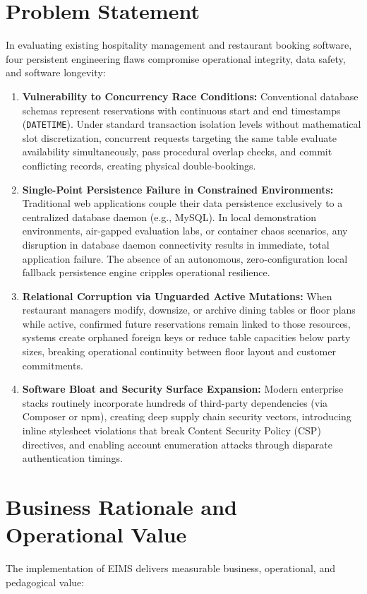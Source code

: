 \section{Problem Statement}
\label{sec:intro_problem}
In evaluating existing hospitality management and restaurant booking software, four persistent engineering flaws compromise operational integrity, data safety, and software longevity:

\begin{enumerate}[label=\textbf{P\arabic*.}]
    \item \textbf{Vulnerability to Concurrency Race Conditions:} Conventional database schemas represent reservations with continuous start and end timestamps (\texttt{DATETIME}). Under standard transaction isolation levels without mathematical slot discretization, concurrent requests targeting the same table evaluate availability simultaneously, pass procedural overlap checks, and commit conflicting records, creating physical double-bookings.
    \item \textbf{Single-Point Persistence Failure in Constrained Environments:} Traditional web applications couple their data persistence exclusively to a centralized database daemon (e.g., MySQL). In local demonstration environments, air-gapped evaluation labs, or container chaos scenarios, any disruption in database daemon connectivity results in immediate, total application failure. The absence of an autonomous, zero-configuration local fallback persistence engine cripples operational resilience.
    \item \textbf{Relational Corruption via Unguarded Active Mutations:} When restaurant managers modify, downsize, or archive dining tables or floor plans while active, confirmed future reservations remain linked to those resources, systems create orphaned foreign keys or reduce table capacities below party sizes, breaking operational continuity between floor layout and customer commitments.
    \item \textbf{Software Bloat and Security Surface Expansion:} Modern enterprise stacks routinely incorporate hundreds of third-party dependencies (via Composer or npm), creating deep supply chain security vectors, introducing inline stylesheet violations that break Content Security Policy (CSP) directives, and enabling account enumeration attacks through disparate authentication timings.
\end{enumerate}

\section{Business Rationale and Operational Value}
\label{sec:intro_business_rationale}
The implementation of EIMS delivers measurable business, operational, and pedagogical value:

